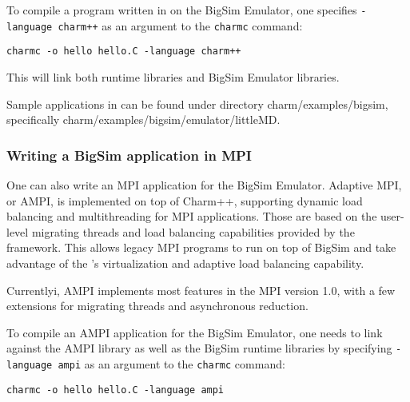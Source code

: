                  To compile a program written in \charmpp{} on the BigSim Emulator, one
specifies \texttt{-language charm++} as an argument to the {\tt charmc} command:
\begin{verbatim}
charmc -o hello hello.C -language charm++
\end{verbatim}
        This will link both \charmpp{} runtime libraries and BigSim Emulator
libraries.

Sample applications in \charmpp{} can be found under directory
        charm/examples/bigsim, specifically charm/examples/bigsim/emulator/littleMD.

        \subsubsection{Writing a BigSim application in MPI}

        One can also write an MPI application for the BigSim Emulator.
            Adaptive MPI, or AMPI, is implemented on top of Charm++, supporting
        dynamic load balancing and multithreading for MPI applications. Those are based
on the user-level migrating threads and load balancing capabilities provided
by the \charmpp{} framework. This allows legacy MPI programs to run 
        on top of BigSim \charmpp{} and take advantage of the \charmpp{}'s
virtualization and adaptive load balancing capability.

        Currentlyi, AMPI implements most features in the MPI version 1.0, with a few
extensions for migrating threads and asynchronous reduction.

                 To compile an AMPI application for the BigSim Emulator, one needs
        to link against the AMPI library as well as the BigSim \charmpp{} runtime
libraries by specifying \texttt{-language ampi} as an argument to 
        the {\tt charmc} command:
\begin{verbatim}
charmc -o hello hello.C -language ampi
\end{verbatim}

